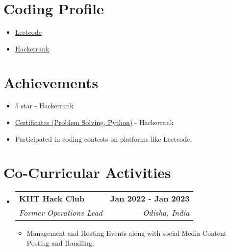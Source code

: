 \documentclass[letterpaper,11pt]{article}
\makeatletter
\newcommand{\resumeItem}[1]{
  \item\small{
	{#1 \vspace{-2pt}}
  }
}
\newcommand{\resumeSubheading}[4]{
  \vspace{-2pt}\item
	\begin{tabular*}{1.0\textwidth}[t]{l@{\extracolsep{\fill}}r}
  	\textbf{#1} & \textbf{\small #2} \\
  	\textit{\small#3} & \textit{\small #4} \\
	\end{tabular*}\vspace{-7pt}
}
\newcommand{\resumeSubHeadingListStart}{\begin{itemize}[leftmargin=0.0in, label={}]}
\newcommand{\resumeSubHeadingListEnd}{\end{itemize}}
\newcommand{\resumeItemListStart}{\begin{itemize}}
\newcommand{\resumeItemListEnd}{\end{itemize}\vspace{-5pt}}
\makeatother
\begin{document}
\section{Coding Profile}
\vspace{5pt}
 \begin{itemize}[leftmargin=0.15in, label={}]
	\resumeItemListStart
    	\resumeItem {\href{https://leetcode.com/Sikta/}{Leetcode}}
    	
    		\resumeItem {\href{https://www.hackerrank.com/moon_sikta}{Hackerrank}}
  	\resumeItemListEnd
 \end{itemize}
   \vspace{-10pt}

\section{Achievements}
\vspace{5pt}
 \begin{itemize}[leftmargin=0.15in, label={}]
	\resumeItemListStart
            \resumeItem{5 star - Hackerrank}
            \resumeItem{\href{https://drive.google.com/drive/folders/1nlPlaAIpHYg7uezN-R2Y-jTBNSS5hS2Z?usp=sharing}{Certificates (Problem Solving, Python)} - Hackerrank}
    	\resumeItem{Participated in coding contests on platforms like Leetcode.}
    	
  	\resumeItemListEnd
 \end{itemize}
  \vspace{-10pt}
 
%  
\section{Co-Curricular Activities}
\vspace{5pt}
  \resumeSubHeadingListStart
	\resumeSubheading
  	{KIIT Hack Club }{Jan 2022 - Jan 2023}
  	{Former Operations Lead }{Odisha, India}
  		\resumeItemListStart
    	\resumeItem{Management and Hosting Events along with social Media Content Posting and Handling.}
	\resumeItemListEnd
  	
  \resumeSubHeadingListEnd
\end{document}
